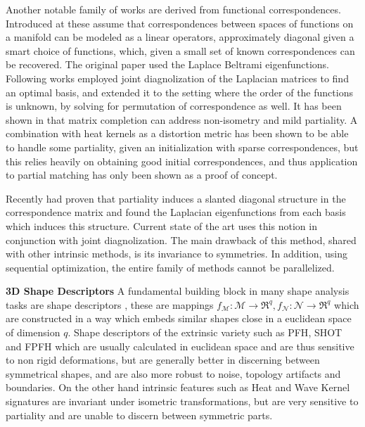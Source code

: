 \documentclass[10pt,twocolumn,letterpaper]{article}
\begin{document}
Another notable family of works are derived from functional correspondences. Introduced at\cite{Ovsjanikov:2012:FMF:2185520.2185526} these assume that correspondences between spaces of functions on a manifold can be modeled as a linear operators, approximately diagonal given a smart choice of functions, which, given a small set of known correspondences can be recovered. The original paper used the Laplace Beltrami eigenfunctions. Following works employed joint diagnolization of the Laplacian matrices to find an optimal basis, and\cite{pokrass2013sparse} extended it to the setting where the order of the functions is unknown, by solving for permutation of correspondence as well. It has been shown in \cite{kovnatsky2015functional} that matrix completion can address non-isometry and mild partiality. A combination with heat kernels as a distortion metric\cite{vestner2017efficient} has been shown to be able to handle some partiality, given an initialization with sparse correspondences, but this relies heavily on obtaining good initial correspondences, and thus application to partial matching has only been shown as a proof of concept.

Recently \cite{rodola2017partial} had proven that partiality induces a slanted diagonal structure in the correspondence matrix and found the Laplacian eigenfunctions from each basis which induces this structure. Current state of the art\cite{litany2017fully} uses this notion in conjunction with joint diagnolization. The main drawback of this method, shared with other intrinsic methods, is its invariance to symmetries. In addition, using sequential optimization, the entire family of methods cannot be parallelized. 

\textbf{3D Shape Descriptors} 
A fundamental building block in many shape analysis tasks are shape descriptors , these are mappings  $f_\mathcal{M}:\mathcal{M}\rightarrow\Re^q,f_\mathcal{N}:\mathcal{N}\rightarrow\Re^q$ which are constructed in a way which embeds similar shapes close in a euclidean space of dimension $q$. 
Shape descriptors of the extrinsic variety such as PFH\cite{rusu2008learning}, SHOT and FPFH\cite{rusu2009fast} which are usually calculated in euclidean space and are thus sensitive to non rigid deformations, but are generally better in discerning between symmetrical shapes, and are also more robust to noise, topology artifacts and boundaries. 
On the other hand intrinsic features such as Heat\cite{bronstein2010scale} and Wave Kernel signatures\cite{aubry2011wave} are invariant under isometric transformations, but are very sensitive to partiality and are unable to discern between symmetric parts.
\end{document}
